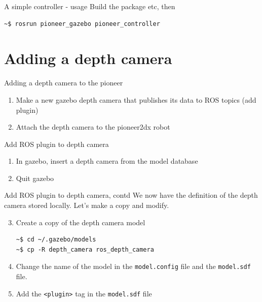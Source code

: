 \documentclass[presentation,aspectratio=1610]{beamer}
\begin{document}
\begin{frame}[fragile,label=sec-2-2]{A simple controller - usage}
 Build the package etc, then

\begin{verbatim}
~$ rosrun pioneer_gazebo pioneer_controller
\end{verbatim}
\end{frame}

\section{Adding a depth camera}
\label{sec-3}
\begin{frame}[label=sec-3-1]{Adding a depth camera to the pioneer}
\begin{enumerate}
\item Make a new gazebo depth camera that publishes its data to ROS topics (add plugin)
\item Attach the depth camera to the pioneer2dx robot
\end{enumerate}
\end{frame}
\begin{frame}[label=sec-3-2]{Add ROS plugin to depth camera}
\begin{enumerate}
\item In gazebo, insert a depth camera from the model database
\item Quit gazebo
\end{enumerate}
\end{frame}

\begin{frame}[fragile,label=sec-3-3]{Add ROS plugin to depth camera, contd}
 We now have the definition of the depth camera stored locally. Let's make a copy and modify.

\begin{enumerate}
\setcounter{enumi}{2}
\item Create a copy of the depth camera model
\begin{verbatim}
~$ cd ~/.gazebo/models
~$ cp -R depth_camera ros_depth_camera
\end{verbatim}
\item Change the name of the model in the \texttt{model.config} file and the \texttt{model.sdf} file.
\item Add the \texttt{<plugin>} tag in the \texttt{model.sdf} file
\end{enumerate}
\end{frame}
\end{document}
